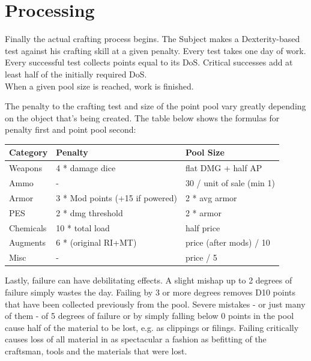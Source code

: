 \documentclass[12pt,a4paper,openany,usenames,dvipsnames]{book}
\begin{document}
	\chapter{Processing}
	\vspace{-10mm}%
	Finally the actual crafting process begins.
	The Subject makes a Dexterity-based test against his crafting skill at a given penalty.
	Every test takes one day of work.
	Every successful test collects points equal to its DoS.
	Critical successes add at least half of the initially required DoS.
	\\%
	When a given pool size is reached, work is finished.\par
	The penalty to the crafting test and size of the point pool vary greatly depending on the object that’s being created. The table below shows the formulas for penalty first and point pool second:
	\par
	\begin{tabularx}{\columnwidth}{X|ll}
		Category & Penalty & Pool Size \\ \hline
		Weapons & 4 * damage dice & flat DMG + half AP \\
		Ammo & - & 30 / unit of sale (min 1) \\
		Armor & 3 * Mod points (+15 if powered) & 2 * avg armor \\
		PES & 2 * dmg threshold & 2 * armor \\
		Chemicals & 10 * total load & half price \\
		Augments & 6 * (original RI+MT) & price (after mods) / 10 \\
		Misc & - & price / 5
	\end{tabularx}\par
	Lastly, failure can have debilitating effects.
	A slight mishap up to 2 degrees of failure simply wastes the day.
	Failing by 3 or more degrees removes D10 points that have been collected previously from the pool.
	Severe mistakes - or just many of them - of 5 degrees of failure or by simply falling below 0 points in the pool cause half of the material to be lost, e.g. as clippings or filings.
	Failing critically causes loss of all material in as spectacular a fashion
		as befitting of the craftsman, tools and the materials that were lost.

\end{document}
